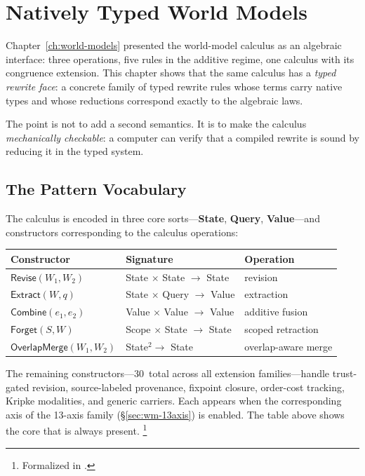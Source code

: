 \documentclass[11pt,openany]{report}
\begin{document}
\chapter{Natively Typed World Models}
\label{ch:typed}

Chapter~\ref{ch:world-models} presented the world-model calculus as
an algebraic interface: three operations, five rules in the additive
regime, one calculus with its congruence extension.  This chapter shows that the
same calculus has a \emph{typed rewrite face}: a concrete family of
typed rewrite rules whose terms carry native types and whose reductions
correspond exactly to the algebraic laws.

The point is not to add a second semantics.  It is to make the
calculus \emph{mechanically checkable}: a computer can verify that a
compiled rewrite is sound by reducing it in the typed system.

\section{The Pattern Vocabulary}

The calculus is encoded in three core sorts---\textbf{State},
\textbf{Query}, \textbf{Value}---and constructors corresponding to
the calculus operations:

\medskip
\begin{center}
\begin{tabular}{lll}
\toprule
\textbf{Constructor} & \textbf{Signature} & \textbf{Operation} \\
\midrule
$\mathsf{Revise}(W_1, W_2)$ & State $\times$ State $\to$ State
  & revision \\
$\mathsf{Extract}(W, q)$ & State $\times$ Query $\to$ Value
  & extraction \\
$\mathsf{Combine}(e_1, e_2)$ & Value $\times$ Value $\to$ Value
  & additive fusion \\
$\mathsf{Forget}(S, W)$ & Scope $\times$ State $\to$ State
  & scoped retraction \\
$\mathsf{OverlapMerge}(W_1, W_2)$ & State$^2 \to$ State
  & overlap-aware merge \\
\bottomrule
\end{tabular}
\end{center}
\medskip

\noindent
The remaining constructors---30~total across all extension
families---handle trust-gated revision, source-labeled provenance,
fixpoint closure, order-cost tracking, Kripke modalities, and generic
carriers.  Each appears when the corresponding axis of the 13-axis
family (\S\ref{sec:wm-13axis}) is enabled.  The table above shows the
core that is always present.%
\footnote{Formalized in
.}
\end{document}
